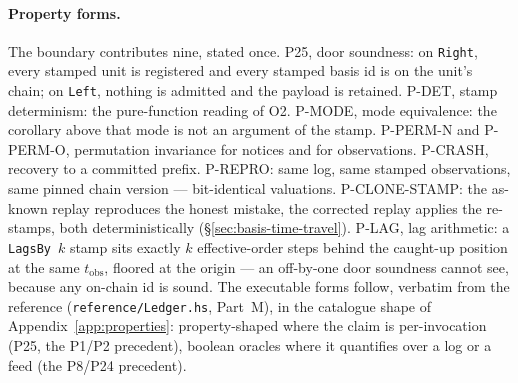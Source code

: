 \documentclass[11pt,a4paper]{article}
\begin{document}
\paragraph{Property forms.} The boundary contributes nine, stated once. P25, door
soundness: on \texttt{Right}, every stamped unit is registered and every stamped
basis id is on the unit's chain; on \texttt{Left}, nothing is admitted and the
payload is retained. P-DET, stamp determinism: the pure-function reading of O2.
P-MODE, mode equivalence: the corollary above that mode is not an argument of the
stamp. P-PERM-N and P-PERM-O, permutation invariance for notices and for
observations. P-CRASH, recovery to a committed prefix. P-REPRO: same log, same
stamped observations, same pinned chain version --- bit-identical valuations.
P-CLONE-STAMP: the as-known replay reproduces the honest mistake, the corrected
replay applies the re-stamps, both deterministically
(\S\ref{sec:basis-time-travel}). P-LAG, lag arithmetic: a \texttt{LagsBy}~$k$
stamp sits exactly $k$ effective-order steps behind the caught-up position at the
same $t_{\mathrm{obs}}$, floored at the origin --- an off-by-one door soundness
cannot see, because any on-chain id is sound. The executable forms follow, verbatim from the
reference (\texttt{reference/Ledger.hs}, Part~M), in the catalogue shape of
Appendix~\ref{app:properties}: property-shaped where the claim is
per-invocation (P25, the P1/P2 precedent), boolean oracles where it quantifies
over a log or a feed (the P8/P24 precedent).
\end{document}
